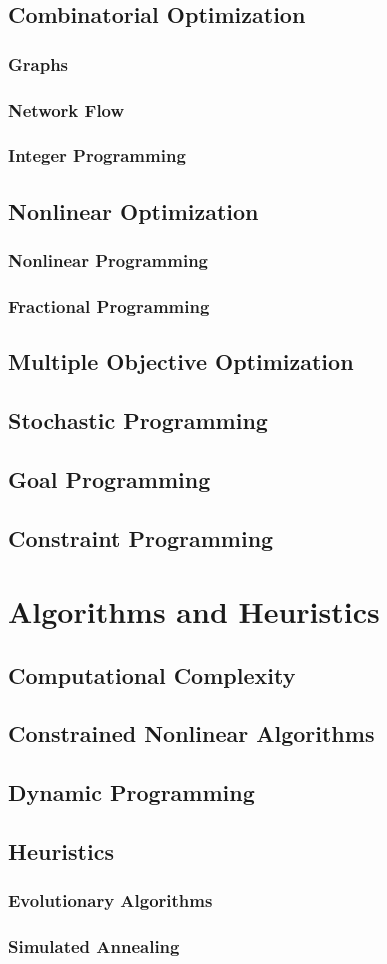 \documentclass[10pt,legalpaper]{book}
\theoremstyle{definition}
\theoremstyle{plain}
\theoremstyle{remark}
\begin{document}
\chapter{Combinatorial Optimization}
\section{Graphs}
\section{Network Flow}
\section{Integer Programming}

\chapter{Nonlinear Optimization} 
\section{Nonlinear Programming}
\section{Fractional Programming}

\chapter{Multiple Objective Optimization}
\chapter{Stochastic Programming}
\chapter{Goal Programming}
\chapter{Constraint Programming}

\part{Algorithms and Heuristics}
\chapter{Computational Complexity}
\chapter{Constrained Nonlinear Algorithms}
\chapter{Dynamic Programming}

\chapter{Heuristics}
\section{Evolutionary Algorithms}
\section{Simulated Annealing}
\end{document}
